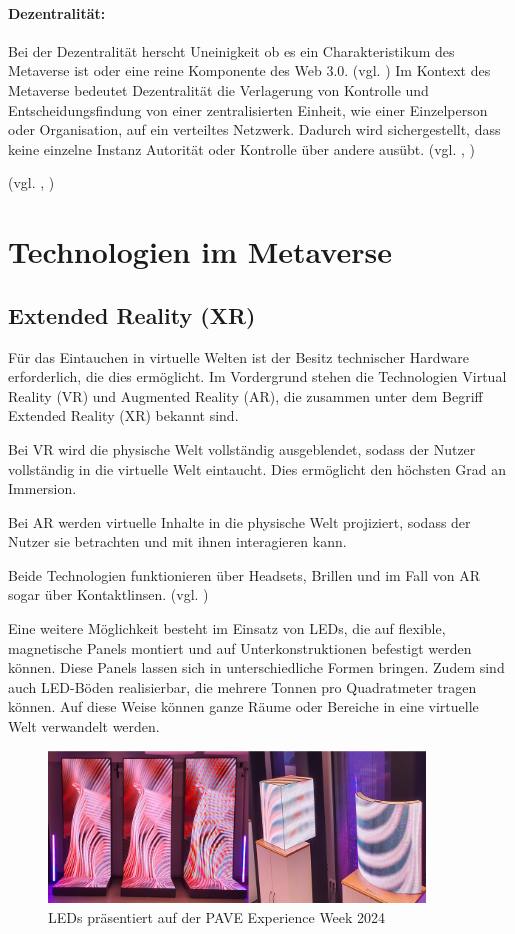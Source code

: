 \paragraph{Dezentralität: } Bei der Dezentralität herscht Uneinigkeit ob es ein Charakteristikum des Metaverse ist oder eine reine Komponente des Web 3.0. (vgl. \cite{Ball22charak}) Im Kontext des Metaverse bedeutet Dezentralität die Verlagerung von Kontrolle und Entscheidungsfindung von einer zentralisierten Einheit, wie einer Einzelperson oder Organisation, auf ein verteiltes Netzwerk. Dadurch wird sichergestellt, dass keine einzelne Instanz Autorität oder Kontrolle über andere ausübt. (vgl. \cite{Ball22charak}, \cite{MVkompaktCharak})


(vgl. \cite{Ball22charak}, \cite{MVkompaktCharak})

\section{Technologien im Metaverse}


\subsection{Extended Reality (XR)}

Für das Eintauchen in virtuelle Welten ist der Besitz technischer Hardware erforderlich, die dies ermöglicht. Im Vordergrund stehen die Technologien Virtual Reality (VR) und Augmented Reality (AR), die zusammen unter dem Begriff Extended Reality (XR) bekannt sind.

Bei VR wird die physische Welt vollständig ausgeblendet, sodass der Nutzer vollständig in die virtuelle Welt eintaucht. Dies ermöglicht den höchsten Grad an Immersion.

Bei AR werden virtuelle Inhalte in die physische Welt projiziert, sodass der Nutzer sie betrachten und mit ihnen interagieren kann.

Beide Technologien funktionieren über Headsets, Brillen und im Fall von AR sogar über Kontaktlinsen. (vgl. \cite{XR-DM})

Eine weitere Möglichkeit besteht im Einsatz von LEDs, die auf flexible, magnetische Panels montiert und auf Unterkonstruktionen befestigt werden können. Diese Panels lassen sich in unterschiedliche Formen bringen. Zudem sind auch LED-Böden realisierbar, die mehrere Tonnen pro Quadratmeter tragen können. Auf diese Weise können ganze Räume oder Bereiche in eine virtuelle Welt verwandelt werden.

\begin{figure}[!h]
    \centering
    \includegraphics[width = 10cm]{figures/LEDs.png}
    \caption{LEDs präsentiert auf der PAVE Experience Week 2024}
    \label{fig:PaveLED}
\end{figure}

